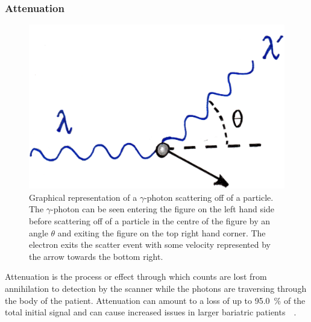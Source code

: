             \subsubsection{Attenuation} \label{sec:attenuation}
                \begin{figure}
                    \centering
                    
                    \includegraphics[width=1.0\linewidth]{figures/background_scatter.png}
                    
                    \captionsetup{singlelinecheck=false, justification=raggedright}
                    \caption{Graphical representation of a $\gamma$-photon scattering off of a particle. The $\gamma$-photon can be seen entering the figure on the left hand side before scattering off of a particle in the centre of the figure by an angle $\theta$ and exiting the figure on the top right hand corner. The electron exits the scatter event with some velocity represented by the arrow towards the bottom right. 
                    } \label{fig:attenuation_scatter}
                \end{figure}
                
                Attenuation is the process or effect through which counts are lost from annihilation to detection by the scanner while the photons are traversing through the body of the patient. Attenuation can amount to a loss of up to \SI{95.0}{\percent} of the total initial signal and can cause increased issues in larger bariatric patients~~. %
                
